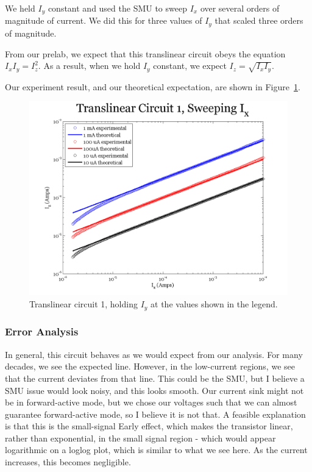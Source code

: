\documentclass{article}
\begin{document}
We held $I_y$ constant and used the SMU to sweep $I_x$ over several orders of magnitude of current.   We did this for three values of $I_y$ that scaled three orders of magnitude.

From our prelab, we expect that this translinear circuit obeys the equation $I_x I_y = I_z ^2$.  As a result, when we hold $I_y$ constant, we expect $I_z = \sqrt{I_xI_y}$.  

Our experiment result, and our theoretical expectation, are shown in Figure~\ref{fig:exp2sweepx}.

\begin{figure}[H]
\begin{center}
\includegraphics[scale=.75]{exp2_sweepx.png}
\caption{Translinear circuit 1, holding $I_y$ at the values shown in the legend.}
\label{fig:exp2sweepx}
\end{center}
\end{figure}

\subsubsection*{Error Analysis}

In general, this circuit behaves as we would expect from our analysis.  For many decades, we see the expected line.  However, in the low-current regions, we see that the current deviates from that line.  This could be the SMU, but I believe a SMU issue would look noisy, and this looks smooth.  Our current sink might not be in forward-active mode, but we chose our voltages such that we can almost guarantee forward-active mode, so I believe it is not that.  A feasible explanation is that this is the small-signal Early effect, which makes the transistor linear, rather than exponential, in the small signal region - which would appear logarithmic on a loglog plot, which is similar to what we see here.  As the current increases, this becomes negligible.
\end{document}
